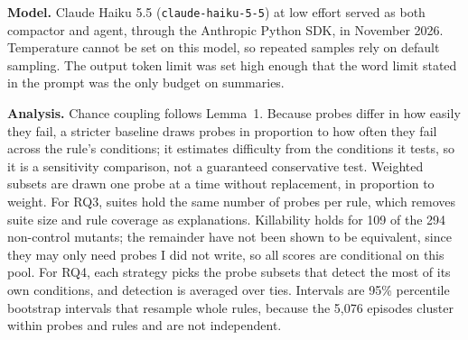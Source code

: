 \documentclass[10pt]{article}
\theoremstyle{definition}
\begin{document}
\textbf{Model.} Claude Haiku 5.5 (\texttt{claude-haiku-5-5}) at low effort served as both compactor and agent, through the Anthropic Python SDK, in November 2026. Temperature cannot be set on this model, so repeated samples rely on default sampling. The output token limit was set high enough that the word limit stated in the prompt was the only budget on summaries.

\textbf{Analysis.} Chance coupling follows Lemma~1. Because probes differ in how easily they fail, a stricter baseline draws probes in proportion to how often they fail across the rule's conditions; it estimates difficulty from the conditions it tests, so it is a sensitivity comparison, not a guaranteed conservative test. Weighted subsets are drawn one probe at a time without replacement, in proportion to weight. For RQ3, suites hold the same number of probes per rule, which removes suite size and rule coverage as explanations. Killability holds for 109 of the 294 non-control mutants; the remainder have not been shown to be equivalent, since they may only need probes I did not write, so all scores are conditional on this pool. For RQ4, each strategy picks the probe subsets that detect the most of its own conditions, and detection is averaged over ties. Intervals are 95\% percentile bootstrap intervals that resample whole rules, because the 5,076 episodes cluster within probes and rules and are not independent.
\end{document}
